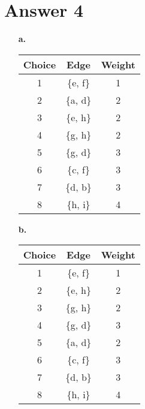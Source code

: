 \documentclass[11pt]{article}
\begin{document}
\section*{Answer 4}
\begin{itemize}
	\item[\textbf{a.}] ~
        \begin{table}[H]
        \centering
        \label{my-label1}
        \begin{tabular}{c|c|c}
	         Choice & Edge & Weight \\
	         \hline
	         1 & \{e, f\} & 1 \\
	         2 & \{a, d\} & 2 \\
	         3 & \{e, h\} & 2 \\
	         4 & \{g, h\} & 2 \\
	         5 & \{g, d\} & 3 \\
	         6 & \{c, f\} & 3 \\
	         7 & \{d, b\} & 3 \\
	         8 & \{h, i\} & 4 \\
        \end{tabular}
        \end{table}
	\item[\textbf{b.}] ~
        \begin{table}[H]
        \centering
        \label{my-label2}
        \begin{tabular}{c|c|c}
	         Choice & Edge & Weight \\
	         \hline
	         1 & \{e, f\} & 1 \\
	         2 & \{e, h\} & 2 \\
	         3 & \{g, h\} & 2 \\
	         4 & \{g, d\} & 3 \\
	         5 & \{a, d\} & 2 \\
	         6 & \{c, f\} & 3 \\
	         7 & \{d, b\} & 3 \\
	         8 & \{h, i\} & 4 \\
        \end{tabular}
        \end{table}
\end{itemize}
\end{document}
